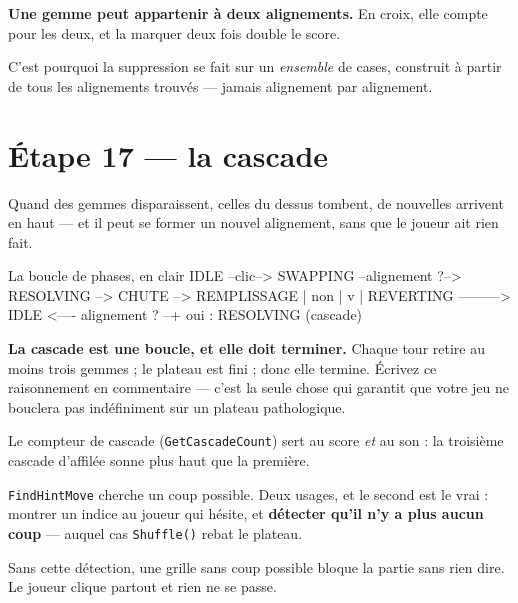 \begin{nkpiege}
\textbf{Une gemme peut appartenir à deux alignements.} En croix, elle compte
pour les deux, et la marquer deux fois double le score.

C'est pourquoi la suppression se fait sur un \emph{ensemble} de cases, construit
à partir de tous les alignements trouvés --- jamais alignement par alignement.
\end{nkpiege}

\section{Étape 17 --- la cascade}

Quand des gemmes disparaissent, celles du dessus tombent, de nouvelles arrivent
en haut --- et il peut se former un nouvel alignement, sans que le joueur ait
rien fait.

\begin{nkcode}{La boucle de phases, en clair}
IDLE --clic--> SWAPPING --alignement ?--> RESOLVING --> CHUTE --> REMPLISSAGE
                   |  non                                             |
                   v                                                  |
              REVERTING ---------> IDLE          <---- alignement ? --+
                                                       oui : RESOLVING (cascade)
\end{nkcode}

\begin{nkretenir}
\textbf{La cascade est une boucle, et elle doit terminer.} Chaque tour retire au
moins trois gemmes ; le plateau est fini ; donc elle termine. Écrivez ce
raisonnement en commentaire --- c'est la seule chose qui garantit que votre jeu
ne bouclera pas indéfiniment sur un plateau pathologique.

Le compteur de cascade (\texttt{GetCascadeCount}) sert au score \emph{et} au
son : la troisième cascade d'affilée sonne plus haut que la première.
\end{nkretenir}

\begin{nkretenir}
\texttt{FindHintMove} cherche un coup possible. Deux usages, et le second est le
vrai : montrer un indice au joueur qui hésite, et \textbf{détecter qu'il n'y a
plus aucun coup} --- auquel cas \texttt{Shuffle()} rebat le plateau.

Sans cette détection, une grille sans coup possible bloque la partie sans rien
dire. Le joueur clique partout et rien ne se passe.
\end{nkretenir}

